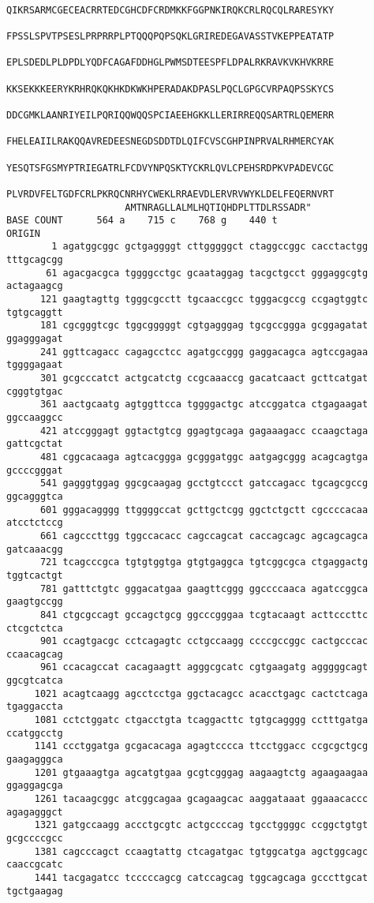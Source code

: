 \begin{lstlisting}
                     QIKRSARMCGECEACRRTEDCGHCDFCRDMKKFGGPNKIRQKCRLRQCQLRARESYKY
                     FPSSLSPVTPSESLPRPRRPLPTQQQPQPSQKLGRIREDEGAVASSTVKEPPEATATP
                     EPLSDEDLPLDPDLYQDFCAGAFDDHGLPWMSDTEESPFLDPALRKRAVKVKHVKRRE
                     KKSEKKKEERYKRHRQKQKHKDKWKHPERADAKDPASLPQCLGPGCVRPAQPSSKYCS
                     DDCGMKLAANRIYEILPQRIQQWQQSPCIAEEHGKKLLERIRREQQSARTRLQEMERR
                     FHELEAIILRAKQQAVREDEESNEGDSDDTDLQIFCVSCGHPINPRVALRHMERCYAK
                     YESQTSFGSMYPTRIEGATRLFCDVYNPQSKTYCKRLQVLCPEHSRDPKVPADEVCGC
                     PLVRDVFELTGDFCRLPKRQCNRHYCWEKLRRAEVDLERVRVWYKLDELFEQERNVRT
                     AMTNRAGLLALMLHQTIQHDPLTTDLRSSADR"
BASE COUNT      564 a    715 c    768 g    440 t
ORIGIN      
        1 agatggcggc gctgaggggt cttgggggct ctaggccggc cacctactgg tttgcagcgg
       61 agacgacgca tggggcctgc gcaataggag tacgctgcct gggaggcgtg actagaagcg
      121 gaagtagttg tgggcgcctt tgcaaccgcc tgggacgccg ccgagtggtc tgtgcaggtt
      181 cgcgggtcgc tggcgggggt cgtgagggag tgcgccggga gcggagatat ggagggagat
      241 ggttcagacc cagagcctcc agatgccggg gaggacagca agtccgagaa tggggagaat
      301 gcgcccatct actgcatctg ccgcaaaccg gacatcaact gcttcatgat cgggtgtgac
      361 aactgcaatg agtggttcca tggggactgc atccggatca ctgagaagat ggccaaggcc
      421 atccgggagt ggtactgtcg ggagtgcaga gagaaagacc ccaagctaga gattcgctat
      481 cggcacaaga agtcacggga gcgggatggc aatgagcggg acagcagtga gccccgggat
      541 gagggtggag ggcgcaagag gcctgtccct gatccagacc tgcagcgccg ggcagggtca
      601 gggacagggg ttggggccat gcttgctcgg ggctctgctt cgccccacaa atcctctccg
      661 cagcccttgg tggccacacc cagccagcat caccagcagc agcagcagca gatcaaacgg
      721 tcagcccgca tgtgtggtga gtgtgaggca tgtcggcgca ctgaggactg tggtcactgt
      781 gatttctgtc gggacatgaa gaagttcggg ggccccaaca agatccggca gaagtgccgg
      841 ctgcgccagt gccagctgcg ggcccgggaa tcgtacaagt acttcccttc ctcgctctca
      901 ccagtgacgc cctcagagtc cctgccaagg ccccgccggc cactgcccac ccaacagcag
      961 ccacagccat cacagaagtt agggcgcatc cgtgaagatg agggggcagt ggcgtcatca
     1021 acagtcaagg agcctcctga ggctacagcc acacctgagc cactctcaga tgaggaccta
     1081 cctctggatc ctgacctgta tcaggacttc tgtgcagggg cctttgatga ccatggcctg
     1141 ccctggatga gcgacacaga agagtcccca ttcctggacc ccgcgctgcg gaagagggca
     1201 gtgaaagtga agcatgtgaa gcgtcgggag aagaagtctg agaagaagaa ggaggagcga
     1261 tacaagcggc atcggcagaa gcagaagcac aaggataaat ggaaacaccc agagagggct
     1321 gatgccaagg accctgcgtc actgccccag tgcctggggc ccggctgtgt gcgccccgcc
     1381 cagcccagct ccaagtattg ctcagatgac tgtggcatga agctggcagc caaccgcatc
     1441 tacgagatcc tcccccagcg catccagcag tggcagcaga gcccttgcat tgctgaagag

\end{lstlisting}
